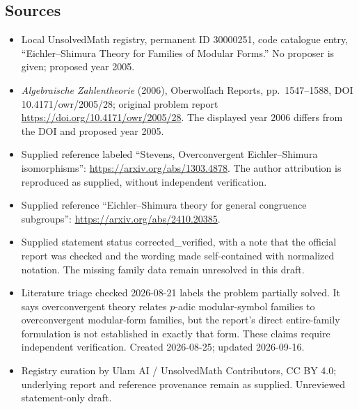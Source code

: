 \documentclass[11pt]{article}
\begin{document}
\subsection{Sources}
\begin{itemize}
\item Local UnsolvedMath registry, permanent ID 30000251, code catalogue entry, ``Eichler--Shimura Theory for Families of Modular Forms.'' No proposer is given; proposed year 2005.
\item \emph{Algebraische Zahlentheorie} (2006), Oberwolfach Reports, pp.\ 1547--1588, DOI 10.4171/owr/2005/28; original problem report \url{https://doi.org/10.4171/owr/2005/28}. The displayed year 2006 differs from the DOI and proposed year 2005.
\item Supplied reference labeled ``Stevens, Overconvergent Eichler--Shimura isomorphisms'': \url{https://arxiv.org/abs/1303.4878}. The author attribution is reproduced as supplied, without independent verification.
\item Supplied reference ``Eichler--Shimura theory for general congruence subgroups'': \url{https://arxiv.org/abs/2410.20385}.
\item Supplied statement status corrected\_verified, with a note that the official report was checked and the wording made self-contained with normalized notation. The missing family data remain unresolved in this draft.
\item Literature triage checked 2026-08-21 labels the problem partially solved. It says overconvergent theory relates $p$-adic modular-symbol families to overconvergent modular-form families, but the report's direct entire-family formulation is not established in exactly that form. These claims require independent verification. Created 2026-08-25; updated 2026-09-16.
\item Registry curation by Ulam AI / UnsolvedMath Contributors, CC BY 4.0; underlying report and reference provenance remain as supplied. Unreviewed statement-only draft.
\end{itemize}
\end{document}

